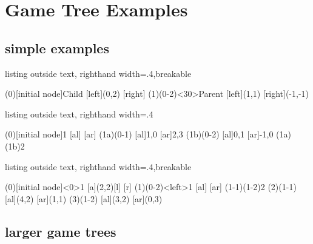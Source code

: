 \clearpage
\section{Game Tree Examples}

\subsection{simple examples}


\begin{tcblisting}{listing outside text, righthand width=.4\linewidth,breakable}
\begin{istgame}[->,>=stealth,shorten >=.5pt]
\xtdistance{15mm}{30mm}
\istroot(0)[initial node]{Child}
  [left]{(0,2)}
  [right]
\endist
\istroot(1)(0-2)<30>{Parent}
  [left]{(1,1)}
  [right]{(-1,-1)}
\endist 
\end{istgame}
\end{tcblisting}

\medskip 

\begin{tcblisting}{listing outside text, righthand width=.4\linewidth}
\begin{istgame}
\xtdistance{10mm}{30mm}
\istroot(0)[initial node]{1}
  [al]
  [ar]
\endist
\xtdistance{7mm}{15mm}
\istroot(1a)(0-1)
  [al]{1,0}
  [ar]{2,3}
\endist
\istroot(1b)(0-2)
  [al]{0,1}
  [ar]{-1,0}
\endist
\xtInfoset(1a)(1b){2}
\end{istgame}
\end{tcblisting}

\medskip 

\begin{tcblisting}{listing outside text, righthand width=.4\linewidth,breakable}
\begin{istgame}
\xtdistance{15mm}{30mm}
\istroot[-135](0)[initial node]<0>{1}
  [a]{(2,2)}[l]
  [r]
\endist 
\istroot(1)(0-2)<left>{1}
  [al]
  [ar]
\endist 
\xtInfoset(1-1)(1-2){2}
\xtdistance{10mm}{20mm}
\istroot(2)(1-1)
  \istb{\ell}[al]{(4,2)}
  [ar]{(1,1)}
\endist 
\istroot(3)(1-2)
  \istb{\ell}[al]{(3,2)}
  [ar]{(0,3)}
\endist 
\end{istgame}
\end{tcblisting}

\subsection{larger game trees}

